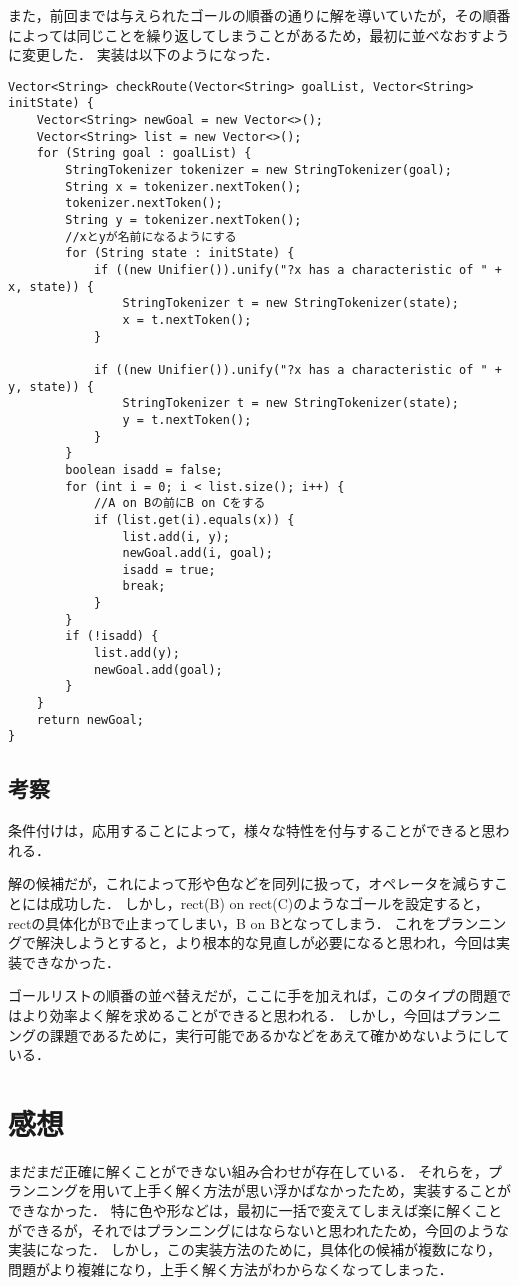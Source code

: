 \documentclass{jarticle}
\begin{document}
また，前回までは与えられたゴールの順番の通りに解を導いていたが，その順番によっては同じことを繰り返してしまうことがあるため，最初に並べなおすように変更した．
実装は以下のようになった．

\begin{lstlisting}[caption=ゴールリストの中身を並べなおす,label=src:blockList]
Vector<String> checkRoute(Vector<String> goalList, Vector<String> initState) {
    Vector<String> newGoal = new Vector<>();
    Vector<String> list = new Vector<>();
    for (String goal : goalList) {
        StringTokenizer tokenizer = new StringTokenizer(goal);
        String x = tokenizer.nextToken();
        tokenizer.nextToken();
        String y = tokenizer.nextToken();
        //xとyが名前になるようにする
        for (String state : initState) {
            if ((new Unifier()).unify("?x has a characteristic of " + x, state)) {
                StringTokenizer t = new StringTokenizer(state);
                x = t.nextToken();
            }
            
            if ((new Unifier()).unify("?x has a characteristic of " + y, state)) {
                StringTokenizer t = new StringTokenizer(state);
                y = t.nextToken();
            }
        }
        boolean isadd = false;
        for (int i = 0; i < list.size(); i++) {
            //A on Bの前にB on Cをする
            if (list.get(i).equals(x)) {
                list.add(i, y);
                newGoal.add(i, goal);
                isadd = true;
                break;
            }
        }
        if (!isadd) {
            list.add(y);
            newGoal.add(goal);
        }
    }
    return newGoal;
}
\end{lstlisting}

\subsection{考察}
条件付けは，応用することによって，様々な特性を付与することができると思われる．

解の候補だが，これによって形や色などを同列に扱って，オペレータを減らすことには成功した．
しかし，rect(B) on rect(C)のようなゴールを設定すると，rectの具体化がBで止まってしまい，B on Bとなってしまう．
これをプランニングで解決しようとすると，より根本的な見直しが必要になると思われ，今回は実装できなかった．

ゴールリストの順番の並べ替えだが，ここに手を加えれば，このタイプの問題ではより効率よく解を求めることができると思われる．
しかし，今回はプランニングの課題であるために，実行可能であるかなどをあえて確かめないようにしている．


\section{感想}
まだまだ正確に解くことができない組み合わせが存在している．
それらを，プランニングを用いて上手く解く方法が思い浮かばなかったため，実装することができなかった．
特に色や形などは，最初に一括で変えてしまえば楽に解くことができるが，それではプランニングにはならないと思われたため，今回のような実装になった．
しかし，この実装方法のために，具体化の候補が複数になり，問題がより複雑になり，上手く解く方法がわからなくなってしまった．
\end{document}
